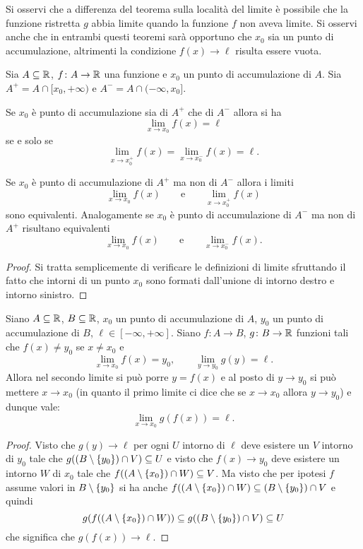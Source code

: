 Si osservi che a differenza del teorema sulla località del limite è
possibile che la funzione ristretta $g$ abbia limite quando la funzione
$f$ non aveva limite.
Si osservi anche che in entrambi questi teoremi sarà opportuno 
che $x_0$ sia un punto di accumulazione, altrimenti la condizione $f(x)\to \ell$ 
risulta essere vuota.

\begin{theorem}%
\mymark{*}%
Sia $A\subseteq \mathbb R$, $f\colon A \to \mathbb R$ una funzione e $x_0$ un punto di accumulazione
di $A$. Sia $A^+ = A \cap [x_0,+\infty)$ e $A^- = A \cap (-\infty, x_0]$.

Se $x_0$ è punto di accumulazione sia di $A^+$ che di $A^-$
allora si ha
\[
  \lim_{x\to x_0} f(x) = \ell
\]
se e solo se
\[
  \lim_{x\to x_0^+} f(x) = \lim_{x\to x_0^-} f(x) = \ell.
\]

Se $x_0$ è punto di accumulazione di $A^+$ ma non di $A^-$ allora
i limiti
\[
  \lim_{x\to x_0} f(x) \qquad \text{e}\qquad \lim_{x\to x_0^+} f(x)
\]
sono equivalenti. Analogamente se $x_0$ è punto di accumulazione
di $A^-$ ma non di $A^+$ risultano equivalenti
\[
  \lim_{x\to x_0} f(x) \qquad \text{e}\qquad \lim_{x\to x_0^-} f(x).
\]
\end{theorem}
%
\begin{proof}
Si tratta semplicemente di verificare le definizioni di limite sfruttando il fatto che intorni di un punto $x_0$ sono formati dall'unione di intorno destro e intorno sinistro.
\end{proof}

\begin{theorem}
\label{th:limite_composta}
Siano $A\subseteq \mathbb R$, $B\subseteq \mathbb R$,
$x_0$ un punto di accumulazione di $A$,
$y_0$ un punto di accumulazione di $B$,
$\ell\in [-\infty,+\infty]$.
Siano $f\colon A \to B$, $g\colon B\to \mathbb R$
funzioni tali che $f(x)\neq y_0$ se $x\neq x_0$ e 
\[
  \lim_{x\to x_0} f(x) = y_0,
\qquad
  \lim_{y\to y_0} g(y) = \ell.
\]
Allora nel secondo limite si può porre $y=f(x)$ e al posto di $y\to y_0$ 
si può mettere $x\to x_0$ (in quanto il primo limite ci dice che se $x\to x_0$ 
allora $y\to y_0$) e dunque vale:
\[
 \lim_{x\to x_0} g(f(x)) = \ell.
\]
\end{theorem}
%
\begin{proof}
Visto che $g(y)\to \ell$
per ogni $U$ intorno di $\ell$ deve esistere un $V$ intorno di $y_0$
tale che $g((B\setminus{\left\{ y_0 \right\}})\cap V) \subseteq U$
e visto  che $f(x)\to y_0$ deve esistere un intorno $W$ di $x_0$
tale che $f((A\setminus{\left\{ x_0 \right\}})\cap W) \subseteq V$.
Ma visto che per ipotesi $f$ assume valori in $B\setminus{\left\{ y_0 \right\}}$
si ha anche $f((A\setminus{\left\{ x_0 \right\}})\cap W)\subseteq (B\setminus{\left\{ y_0 \right\}}) \cap V$
e quindi
\[
  g(f((A\setminus{\left\{ x_0 \right\}})\cap W)) \subseteq g((B\setminus {\left\{ y_0 \right\}}) \cap V)
  \subseteq U
\]
che significa che $g(f(x)) \to \ell$.
\end{proof}

